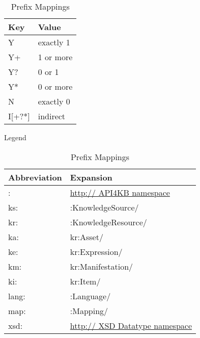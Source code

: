 \documentclass[runningheads]{llncs}
\begin{document}
\begin{table}[h]
\begin{minipage}[b]{0.45\linewidth}
\centering
\begin{tabular}{|l|l|}
\hline
\textbf{Key} & \textbf{Value} \\ \hline
Y            & exactly 1      \\ \hline
Y+           & 1 or more      \\ \hline
Y?           & 0 or 1         \\ \hline
Y*           & 0 or more      \\ \hline
N            & exactly 0      \\ \hline
I[+?*]       & indirect      \\ \hline
\end{tabular}
\caption{Legend}
\label{legend}
\end{minipage}
\hspace{0.5cm}
\begin{minipage}[b]{0.45\linewidth}
\centering
\begin{tabular}{|l|l|}
\hline
\textbf{Abbreviation} & \textbf{Expansion} \\ \hline
:            & \url{http:// API4KB namespace}      \\ \hline
ks:            & :KnowledgeSource/      \\ \hline
kr:            & :KnowledgeResource/      \\ \hline
ka:            & kr:Asset/      \\ \hline
ke:            & kr:Expression/      \\ \hline
km:            & kr:Manifestation/      \\ \hline
ki:            & kr:Item/      \\ \hline
lang:            & :Language/      \\ \hline
map:            & :Mapping/      \\ \hline
xsd:            & \url{http:// XSD Datatype namespace}      \\ \hline
\end{tabular}
\caption{Prefix Mappings}
\label{abbreviations}
\end{minipage}
\end{table}
\end{document}
